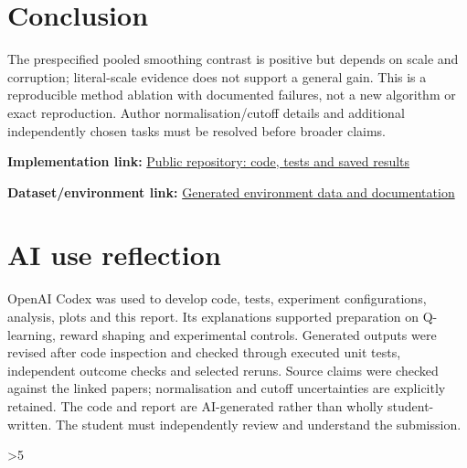 \documentclass{COMPXXXX}
\begin{document}
\balance
\section{Conclusion}
The prespecified pooled smoothing contrast is positive but depends on scale and corruption; literal-scale evidence does not support a general gain. This is a reproducible method ablation with documented failures, not a new algorithm or exact reproduction. Author normalisation/cutoff details and additional independently chosen tasks must be resolved before broader claims.

\noindent\textbf{Implementation link:} \href{https://github.com/Izumizon/comp1818-potential-shifting}{Public repository: code, tests and saved results}\par
\noindent\textbf{Dataset/environment link:} \href{https://github.com/Izumizon/comp1818-potential-shifting/tree/main/data}{Generated environment data and documentation}\par

\section*{AI use reflection}
OpenAI Codex was used to develop code, tests, experiment configurations, analysis, plots and this report. Its explanations supported preparation on Q-learning, reward shaping and experimental controls. Generated outputs were revised after code inspection and checked through executed unit tests, independent outcome checks and selected reruns. Source claims were checked against the linked papers; normalisation and cutoff uncertainties are explicitly retained. The code and report are AI-generated rather than wholly student-written. The student must independently review and understand the submission.

\clearpage
\nobalance
\label{first-excluded-page}
\ifnum\value{page}>5\relax
\PackageError{COMP1818}{Counted report exceeds four pages}{Edit the content; do not shrink the official formatting.}
\fi

\clearpage

\end{document}
